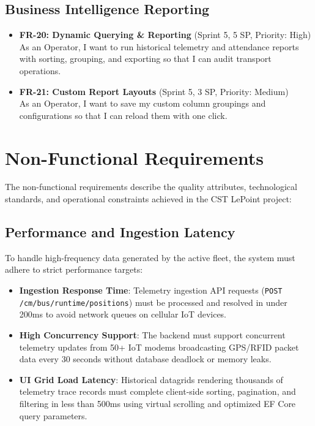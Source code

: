 \subsection{Business Intelligence Reporting}
\begin{itemize}
  \item \textbf{FR-20: Dynamic Querying \& Reporting} (Sprint 5, 5 SP, Priority: High) \\
  As an Operator, I want to run historical telemetry and attendance reports with sorting, grouping, and exporting so that I can audit transport operations.
  \item \textbf{FR-21: Custom Report Layouts} (Sprint 5, 3 SP, Priority: Medium) \\
  As an Operator, I want to save my custom column groupings and configurations so that I can reload them with one click.
\end{itemize}

\section{Non-Functional Requirements}

The non-functional requirements describe the quality attributes, technological standards, and operational constraints achieved in the CST LePoint project:

\subsection{Performance and Ingestion Latency}
To handle high-frequency data generated by the active fleet, the system must adhere to strict performance targets:
\begin{itemize}
  \item \textbf{Ingestion Response Time}: Telemetry ingestion API requests (\texttt{POST /cm/bus/runtime/positions}) must be processed and resolved in under 200ms to avoid network queues on cellular IoT devices.
  \item \textbf{High Concurrency Support}: The backend must support concurrent telemetry updates from 50+ IoT modems broadcasting GPS/RFID packet data every 30 seconds without database deadlock or memory leaks.
  \item \textbf{UI Grid Load Latency}: Historical datagrids rendering thousands of telemetry trace records must complete client-side sorting, pagination, and filtering in less than 500ms using virtual scrolling and optimized EF Core query parameters.
\end{itemize}

